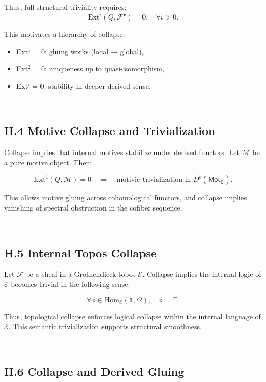 \documentclass[11pt]{article}
\begin{document}
Thus, full structural triviality requires:
\[
\mathrm{Ext}^i(Q, \mathcal{F}^\bullet) = 0, \quad \forall i > 0.
\]

This motivates a hierarchy of collapse:

\begin{itemize}
  \item Ext$^1$ = 0: gluing works (local → global),
  \item Ext$^2$ = 0: uniqueness up to quasi-isomorphism,
  \item Ext$^i$ = 0: stability in deeper derived sense.
\end{itemize}

---

\subsection*{H.4 Motive Collapse and Trivialization}

Collapse implies that internal motives stabilize under derived functors.  
Let $\mathcal{M}$ be a pure motive object. Then:

\[
\mathrm{Ext}^1(Q, \mathcal{M}) = 0 \quad \Rightarrow \quad 
\text{motivic trivialization in } D^b(\mathsf{Mot}_\mathbb{Q}).
\]

This allows motive gluing across cohomological functors, and collapse implies vanishing of spectral obstruction in the cofiber sequence.

---

\subsection*{H.5 Internal Topos Collapse}

Let $\mathcal{F}$ be a sheaf in a Grothendieck topos $\mathcal{E}$.  
Collapse implies the internal logic of $\mathcal{E}$ becomes trivial in the following sense:

\[
\forall \phi \in \mathrm{Hom}_\mathcal{E}(\mathbb{1}, \Omega), \quad \phi = \top.
\]

Thus, topological collapse enforces logical collapse within the internal language of $\mathcal{E}$.  
This semantic trivialization supports structural smoothness.

---

\subsection*{H.6 Collapse and Derived Gluing}
\end{document}
